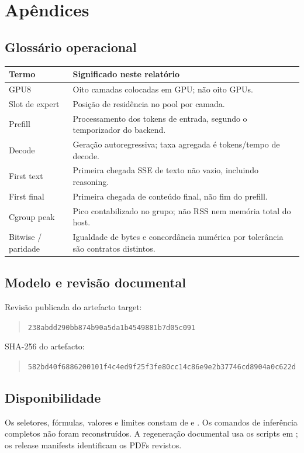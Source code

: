 \clearpage
\section{Apêndices}
\subsection{Glossário operacional}
\begin{tabularx}{\linewidth}{@{}p{32mm}Y@{}}
\toprule \textbf{Termo} & \textbf{Significado neste relatório}\\ \midrule
GPU8 & Oito camadas colocadas em GPU; não oito GPUs.\\
Slot de expert & Posição de residência no pool por camada.\\
Prefill & Processamento dos tokens de entrada, segundo o temporizador do backend.\\
Decode & Geração autoregressiva; taxa agregada é tokens/tempo de decode.\\
First text & Primeira chegada SSE de texto não vazio, incluindo reasoning.\\
First final & Primeira chegada de conteúdo final, não fim do prefill.\\
Cgroup peak & Pico contabilizado no grupo; não RSS nem memória total do host.\\
Bitwise / paridade & Igualdade de bytes e concordância numérica por tolerância são contratos distintos.\\
\bottomrule
\end{tabularx}
 

\subsection{Modelo e revisão documental}
Revisão publicada do artefacto target:
\begin{quote}\small\nolinkurl{238abdd290bb874b90a5da1b4549881b7d05c091}\end{quote}
SHA-256 do artefacto:
\begin{quote}\small\nolinkurl{582bd40f6886200101f4c4ed9f25f3fe80cc14c86e9e2b37746cd8904a0c622d}\end{quote}

\subsection{Disponibilidade}

Os seletores, fórmulas, valores e limites constam de  e . Os comandos de inferência completos não foram reconstruídos. A regeneração documental usa os scripts em ; os release manifests identificam os PDFs revistos.
